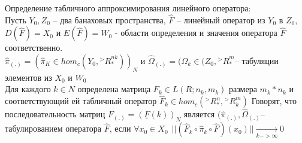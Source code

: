 \documentclass[__main__.tex]{subfiles}
\begin{document}
Определение табличного аппроксимирования линейного оператора:\\
Пусть $Y_0, Z_0$ -- два банаховых пространства, $\hat{F}$  -- линейный оператор из  $Y_0$  в $Z_0$, $D(\hat{F})=X_0$ и $E(\hat{F})=W_0$ - области определения и значения оператора $\hat{F}$ соответственно.\\
$\hat{\pi}_{(.)}=(\hat{\pi}_K \in hom_c(Y_0,{^>R}^{nk}_*))_N$ и $\hat{\Omega}_{(.)}=(\Omega_k\in (Z_0, {^>R}^m_*$-- табуляции элементов из $X_0 $ и $W_0$\\
Для каждого $k\in N$ определена матрица $F_k\in L(R;n_k,m_k)$  размера  $m_k*n_k$ и соответствующий ей табличный оператор $\hat{F}_k\in hom_c(^>R^n_*,{^>R}^m_k)$
Говорят, что последовательность матриц $F_{(.)}=(\underline{F}(k))_N $ является  $(\hat{\pi}_{(.)},\hat{\Omega}_{(.)}$--табулированием оператора  $\hat{F}$, если $\forall x_0 \in X_0 \ \ ||(\hat{F}_k\circ\hat{\pi}_k\circ \hat{F})(x_0)||\underset{k-> \infty}{\longrightarrow}0$
\end{document}
